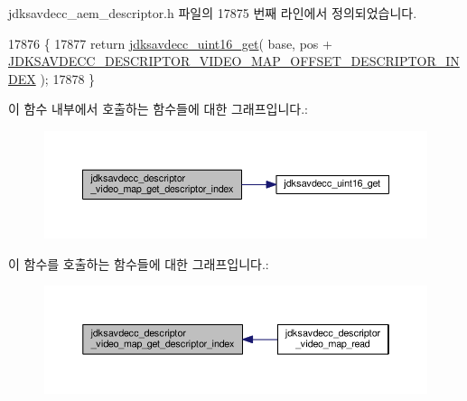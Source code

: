 jdksavdecc\+\_\+aem\+\_\+descriptor.\+h 파일의 17875 번째 라인에서 정의되었습니다.


\begin{DoxyCode}
17876 \{
17877     \textcolor{keywordflow}{return} \hyperlink{group__endian_ga3fbbbc20be954aa61e039872965b0dc9}{jdksavdecc\_uint16\_get}( base, pos + 
      \hyperlink{group__descriptor__video__map_ga71fcc2873352c7ac3d61d03a65606d94}{JDKSAVDECC\_DESCRIPTOR\_VIDEO\_MAP\_OFFSET\_DESCRIPTOR\_INDEX}
       );
17878 \}
\end{DoxyCode}


이 함수 내부에서 호출하는 함수들에 대한 그래프입니다.\+:
\nopagebreak
\begin{figure}[H]
\begin{center}
\leavevmode
\includegraphics[width=350pt]{group__descriptor__video__map_ga5ca5cd6a5dfc92ba7d64d944b7350c05_cgraph}
\end{center}
\end{figure}




이 함수를 호출하는 함수들에 대한 그래프입니다.\+:
\nopagebreak
\begin{figure}[H]
\begin{center}
\leavevmode
\includegraphics[width=350pt]{group__descriptor__video__map_ga5ca5cd6a5dfc92ba7d64d944b7350c05_icgraph}
\end{center}
\end{figure}


